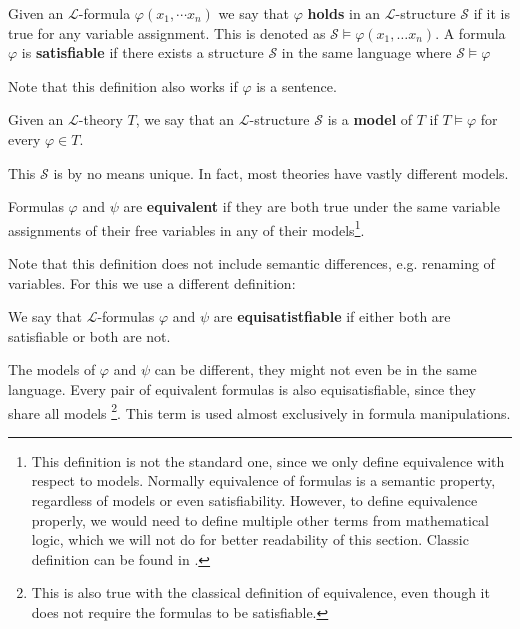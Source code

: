 \begin{defn}
Given an $\mathcal{L}$-formula $\varphi(x_1,\cdots x_n)$ we say that $\varphi$ \textbf{holds} in an $\mathcal{L}$-structure $\mathcal{S}$ if it is true for any variable assignment. This is denoted as $\mathcal{S}\models \varphi(x_1,\dots x_n)$. A formula $\varphi$ is \textbf{satisfiable} if there exists a structure $\mathcal{S}$ in the same language where $\mathcal{S}\models \varphi$
\end{defn}
Note that this definition also works if $\varphi$ is a sentence.

\begin{defn}
Given an $\mathcal{L}$-theory $T$, we say that an $\mathcal{L}$-structure $\mathcal{S}$ is a \textbf{model} of $T$ if $T\models \varphi$ for every $\varphi\in T$.
\end{defn}
This $\mathcal{S}$ is by no means unique. In fact, most theories have vastly different models.

\begin{defn}
Formulas $\varphi$ and $\psi$ are \textbf{equivalent} if they are both true under the same variable assignments of their free variables in any of their models\footnote{This definition is not the standard one, since we only define equivalence with respect to models. Normally equivalence of formulas is a semantic property, regardless of models or even satisfiability. However, to define equivalence properly, we would need to define multiple other terms from mathematical logic, which we will not do for better readability of this section. Classic definition can be found in \cite{logic}.}.
\end{defn}

Note that this definition does not include semantic differences, e.g. renaming of variables. For this we use a different definition:

\begin{defn}
	We say that $\mathcal{L}$-formulas $\varphi$ and $\psi$ are \textbf{equisatistfiable} if either both are satisfiable or both are not.
\end{defn}

The models of $\varphi$ and $\psi$ can be different, they might not even be in the same language. Every pair of equivalent formulas is also equisatisfiable, since they share all models \footnote{This is also true with the classical definition of equivalence, even though it does not require the formulas to be satisfiable.}. This term is used almost exclusively in formula manipulations.


